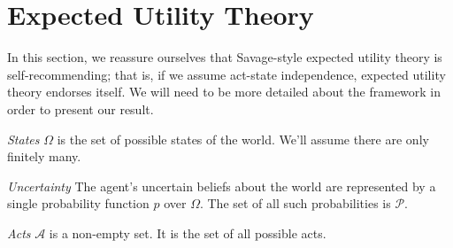 \documentclass[a4paper,final]{article}
\newcommand\A{\mathcal{A}}
\newcommand\Prob{\mathcal{P}} %
\newenvironment{CCM rewritten}
{\begingroup\color{blue}} %
{\endgroup}              %
\begin{document}




\section{Expected Utility Theory}\label{sect:eut}
In this section, we reassure ourselves that Savage-style expected utility theory is self-recommending; that is, if we assume act-state independence, expected utility theory endorses itself. We will need to be more detailed about the framework in order to present our result. 


 \emph{States } $\Omega$ is the set of possible states of the world. We'll assume there are only finitely many.

\emph{Uncertainty } The agent's uncertain beliefs about the world are represented by a single probability function $p$ over $\Omega$. The set of all such probabilities is $\Prob$.

\emph{Acts }
$\A$ is a non-empty set. It is the set of all possible acts. 
\end{document}
